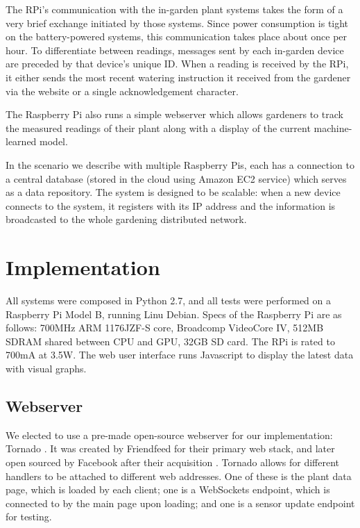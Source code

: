 \documentclass[a4paper]{acm_proc_article-sp}
\begin{document}
The RPi's communication with the in-garden plant systems takes the form of a very brief exchange initiated by those systems.  Since power consumption is tight on the battery-powered systems, this communication takes place about once per hour.  To differentiate between readings, messages sent by each in-garden device are preceded by that device's unique ID.  When a reading is received by the RPi, it either sends the most recent watering instruction it received from the gardener via the website or a single acknowledgement character.

The Raspberry Pi also runs a simple webserver which allows gardeners to track the measured readings of their plant along with a display of the current machine-learned model.

In the scenario we describe with multiple Raspberry Pis, each has a connection to a central database (stored in the cloud using Amazon EC2 service) which serves as a data repository. The system is designed to be scalable: when a new device connects to the system, it registers with its IP address and the information is broadcasted to the whole gardening distributed network. 

\section{Implementation}

All systems were composed in Python 2.7, and all tests were performed on a Raspberry Pi Model B, running Linu Debian.  Specs of the Raspberry Pi are as follows: 700MHz ARM 1176JZF-S core, Broadcomp VideoCore IV, 512MB SDRAM shared between CPU and GPU, 32GB SD card.  The RPi is rated to 700mA at 3.5W. The web user interface runs Javascript to display the latest data with visual graphs.

\subsection{Webserver}

We elected to use a pre-made open-source webserver for our implementation: Tornado \cite{}.  It was created by Friendfeed for their primary web stack, and later open sourced by Facebook after their acquisition \cite{}.  Tornado allows for different handlers to be attached to different web addresses.  One of these is the plant data page, which is loaded by each client; one is a WebSockets endpoint, which is connected to by the main page upon loading; and one is a sensor update endpoint for testing.
\end{document}
